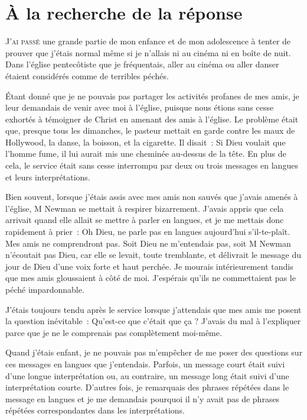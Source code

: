 \chapter{\`A la recherche de la r\'eponse}

\lettrine{J}{'ai passé}
 une grande partie de mon enfance et de mon
 adolescence à tenter de prouver que j'étais normal même si je n'allais ni au
 cinéma ni en boîte de nuit. Dans l'église pentecôtiste que je fréquentais,
 aller au cinéma ou aller danser étaient considérés comme de terribles péchés.

Étant donné que je ne pouvais pas partager les activités profanes
 de mes amis, je leur demandais de venir avec moi à l'église,
 puisque nous étions sans cesse exhortés à témoigner de Christ en amenant
 des amis à l'église. Le problème était que, presque tous les dimanches,
 le pasteur mettait en garde contre les
 maux de Hollywood, la danse, la boisson, et la cigarette.
 Il disait~: \og Si Dieu voulait que l'homme fume, il lui aurait mis une
 cheminée au-dessus de la tête.\fg{}
 En plus de cela, le service était sans cesse interrompu par deux ou trois
 \og messages en langues \fg{} et leurs interprétations.

Bien souvent, lorsque j'étais assis avec mes amis non sauvés que j'avais
 amenés à l'église, M Newman se mettait à respirer bizarrement.
 J'avais appris que cela arrivait quand elle allait se mettre à parler en
 langues, et je me mettais donc rapidement à prier~:
 \og Oh Dieu, ne parle pas en langues aujourd'hui s'il-te-plaît.
 Mes amis ne comprendront pas. \fg{}
 Soit Dieu ne m'entendais pas, soit M Newman n'écoutait pas Dieu,
 car elle se levait, toute tremblante, et délivrait le message du jour de Dieu
 d'une voix forte et haut perchée. Je mourais intérieurement tandis que mes amis
 gloussaient à côté de moi. J'espérais qu'ils ne commettaient pas le péché
 impardonnable.

\pagebreak

J'étais toujours tendu après le service lorsque j'attendais que mes amis me
 posent la question inévitable~:
 \og Qu'est-ce que c'était que ça ? \fg{}
 J'avais du mal à l'expliquer parce que je ne le comprenais pas complètement
 moi-même.

Quand j'étais enfant, je ne pouvais pas m'empêcher de me poser des questions sur
 ces \og messages en langues \fg{} que j'entendais. Parfois, un message court
 était suivi d'une longue interprétation ou, au contraire, un message long était
 suivi d'une interprétation courte. D'autres fois, je remarquais des phrases
 répétées dans le message en langues et je me demandais pourquoi il n'y avait
 pas de phrases répétées correspondantes dans les interprétations.

